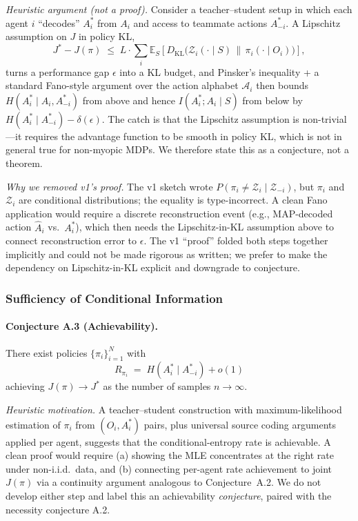 \documentclass[10pt, letterpaper]{article}
\begin{document}
\emph{Heuristic argument (not a proof).} Consider a teacher--student setup in which each agent $i$ ``decodes'' $A_i^*$ from $A_i$ and access to teammate actions $A_{-i}^*$. A Lipschitz assumption on $J$ in policy KL,
\[J^* - J(\pi) \;\leq\; L \cdot \sum_i \mathbb{E}_S\!\left[D_\text{KL}\bigl(\mathcal{Z}_i(\cdot \mid S) \,\|\, \pi_i(\cdot \mid O_i)\bigr)\right],\]
turns a performance gap $\epsilon$ into a KL budget, and Pinsker's inequality + a standard Fano-style argument over the action alphabet $\mathcal{A}_i$ then bounds $H(A_i^*\mid A_i, A_{-i}^*)$ from above and hence $I(A_i^*; A_i \mid S)$ from below by $H(A_i^*\mid A_{-i}^*) - \delta(\epsilon)$. The catch is that the Lipschitz assumption is non-trivial---it requires the advantage function to be smooth in policy KL, which is not in general true for non-myopic MDPs. We therefore state this as a conjecture, not a theorem.

\emph{Why we removed v1's proof.} The v1 sketch wrote $P(\pi_i \neq \mathcal{Z}_i \mid \mathcal{Z}_{-i})$, but $\pi_i$ and $\mathcal{Z}_i$ are conditional distributions; the equality is type-incorrect. A clean Fano application would require a discrete reconstruction event (e.g., MAP-decoded action $\hat{A}_i$ vs.\ $A_i^*$), which then needs the Lipschitz-in-KL assumption above to connect reconstruction error to $\epsilon$. The v1 ``proof'' folded both steps together implicitly and could not be made rigorous as written; we prefer to make the dependency on Lipschitz-in-KL explicit and downgrade to conjecture.

\subsubsection{Sufficiency of Conditional Information}

\paragraph{Conjecture A.3 (Achievability).} There exist policies $\{\pi_i\}_{i=1}^N$ with
\[R_{\pi_i} \;=\; H(A_i^* \mid A_{-i}^*) + o(1)\]
achieving $J(\pi) \to J^*$ as the number of samples $n \to \infty$.

\emph{Heuristic motivation.} A teacher--student construction with maximum-likelihood estimation of $\pi_i$ from $(O_i, A_i^*)$ pairs, plus universal source coding arguments applied per agent, suggests that the conditional-entropy rate is achievable. A clean proof would require (a) showing the MLE concentrates at the right rate under non-i.i.d.\ data, and (b) connecting per-agent rate achievement to joint $J(\pi)$ via a continuity argument analogous to Conjecture~A.2. We do not develop either step and label this an achievability \emph{conjecture}, paired with the necessity conjecture A.2.
\end{document}
